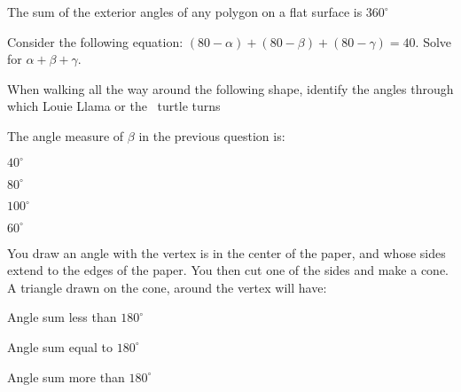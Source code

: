 \documentclass{../ximera}
\author{Claire Merriman}
\begin{document}
\maketitle

\begin{exercise}
 The sum of the exterior angles of any polygon on a flat surface is $360^\circ$
\end{exercise}

\begin{exercise}
 Consider the following equation: $(80-\alpha)+(80-\beta)+(80-\gamma)=40$. Solve for $\alpha+\beta+\gamma$.
\end{exercise}

\begin{exercise}
 When walking all the way around the following shape, identify the angles through which Louie Llama or the \snap\ turtle turns 
     \begin{center}
    \end{center}
\end{exercise}

\begin{exercise}
 The angle measure of $\beta$ in the previous question is:
 
  \begin{enumerate}\begin{multicols}{2}
  \item $40^\circ$
  \item $80^\circ$
  \item $100^\circ$
  \item $60^\circ$
    \end{multicols}
  \end{enumerate}
\end{exercise}

\begin{exercise}
 You draw an angle with the vertex is in the center of the paper, and whose sides extend to the edges of the paper. You then cut one of the sides and make a cone. A triangle drawn on the cone, around the vertex will have:
 
\begin{enumerate}
\begin{multicols}{3}
 \item Angle sum less than $180^\circ$
 \item Angle sum equal to $180^\circ$
   \item Angle sum more than $180^\circ$
\end{multicols}
 
\end{enumerate}
\end{exercise}

\end{document}
